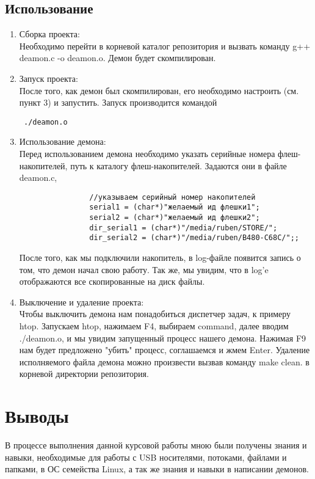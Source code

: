 \documentclass[12pt,a4paper]{scrartcl}
\begin{document}
\subsection{Использование}
	\begin{enumerate}
	\item Сборка проекта: \\
		Необходимо перейти в корневой каталог репозитория и вызвать команду
		g++ deamon.c -o deamon.o. Демон будет скомпилирован.
	\item Запуск проекта: \\
		После того, как демон был скомпилирован, его необходимо настроить (см. пункт 3) и запустить.
		Запуск производится командой\begin{verbatim} ./deamon.o \end{verbatim}
	\item Использование демона: \\
		Перед использованием демона необходимо указать серийные номера флеш-накопителей, путь к каталогу флеш-накопителей.
		Задаются они в файле deamon.c,\begin{verbatim}
				//указываем серийный номер накопителей
				serial1 = (char*)"желаемый ид флешки1";
				serial2 = (char*)"желаемый ид флешки2";
				dir_serial1 = (char*)"/media/ruben/STORE/";
				dir_serial2 = (char*)"/media/ruben/B480-C68C/";;
				\end{verbatim}
		После того, как мы подключили накопитель, в log-файле появится запись о том, что демон начал свою работу.
		Так же, мы увидим, что в log'e отображаются все скопированные на диск файлы.
	\item Выключение и удаление проекта: \\
		Чтобы выключить демона нам понадобиться диспетчер задач, к примеру htop. Запускаем htop, нажимаем F4, выбираем command, далее вводим ./deamon.o, и мы увидим запущенный процесс нашего демона. Нажимая F9 нам будет предложено "убить" 			процесс, соглашаемся и жмем Enter.
		Удаление исполняемого файла демона можно произвести вызвав команду make clean.
		в корневой директории репозитория.
	\end{enumerate}

\section{Выводы}
	В процессе выполнения данной курсовой работы мною были получены знания и навыки, необходимые для работы с USB носителями, потоками, файлами и папками,  в ОС семейства Linux, а так же знания и навыки в написании демонов.
	\newpage
\end{document}
